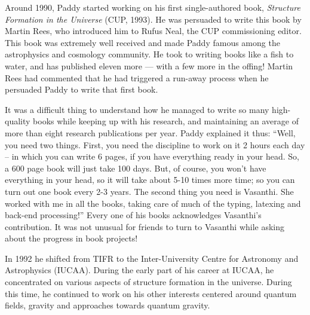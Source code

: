 \documentclass[prd, preprint, longbibliography, 11pt]{revtex4-1}
\begin{document}
Around 1990, Paddy started working on his first single-authored book,
\textit{Structure Formation in the Universe} (CUP, 1993).
He was persuaded to write this book by Martin Rees, who introduced him
to  Rufus Neal, the CUP commissioning editor.
This book was extremely well received and made Paddy famous among the
astrophysics and cosmology community.
He took to writing books like a fish to water, and has published
eleven more --- with a few more in the offing!
Martin Rees had commented that he had triggered a run-away process
when he persuaded Paddy to write that first book. 


It was a difficult thing to understand how he managed to write so many
high-quality books while keeping up with his research, and maintaining
an average of more than eight research publications per year.
Paddy explained it thus: ``Well, you need two things. First, you need
the discipline to work on it 2 hours each day -- in which you can
write 6 pages, if you have everything ready in your head.
So, a 600 page book will just take 100 days.
But, of course,  you won't have everything in your head, so it will
take about 5-10 times more time; so you can turn out one book every
2-3 years.
The second thing you need is Vasanthi.
She worked with me in all the books, taking care of much of the
typing, latexing and back-end processing!''
Every one of his books acknowledges Vasanthi's contribution. 
It was not unusual for friends to turn to Vasanthi while asking about
the progress in book projects!

In 1992 he shifted from TIFR to the Inter-University Centre for
Astronomy and Astrophysics (IUCAA).
During the early part of his career at IUCAA, he concentrated on
various aspects of structure formation in the universe.
During this time, he continued to work on his other interests centered
around quantum fields, gravity and approaches towards quantum
gravity.  
\end{document}
